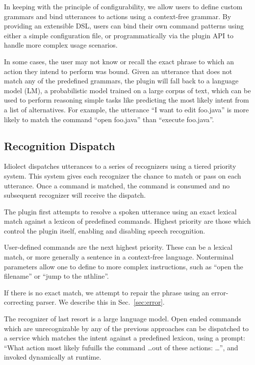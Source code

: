 \documentclass[conference]{IEEEtran}
\begin{document}
In keeping with the principle of configurability, we allow users to define custom grammars and bind utterances to actions using a context-free grammar. By providing an extensible DSL, users can bind their own command patterns using either a simple configuration file, or programmatically via the plugin API to handle more complex usage scenarios.

In some cases, the user may not know or recall the exact phrase to which an action they intend to perform was bound. Given an utterance that does not match any of the predefined grammars, the plugin will fall back to a language model (LM), a probabilistic model trained on a large corpus of text, which can be used to perform reasoning simple tasks like predicting the most likely intent from a list of alternatives. For example, the utterance ``I want to edit foo.java'' is more likely to match the command ``open foo.java'' than ``execute foo.java''.

\subsection{Recognition Dispatch}

Idiolect dispatches utterances to a series of recognizers using a tiered priority system. This system gives each recognizer the chance to match or pass on each utterance. Once a command is matched, the command is consumed and no subsequent recognizer will receive the dispatch.

The plugin first attempts to resolve a spoken utterance using an exact lexical match against a lexicon of predefined commands. Highest priority are those which control the plugin itself, enabling and disabling speech recognition.

User-defined commands are the next highest priority. These can be a lexical match, or more generally a sentence in a context-free language. Nonterminal parameters allow one to define to more complex instructions, such as ``open the \textlangle filename'' or ``jump to the \textlangle nth\textrangle line''.

If there is no exact match, we attempt to repair the phrase using an error-correcting parser. We describe this in Sec.~\ref{sec:error}.

The recognizer of last resort is a large language model. Open ended commands which are unrecognizable by any of the previous approaches can be dispatched to a service which matches the intent against a predefined lexicon, using a prompt: ``What action most likely fufuills the command \ldots out of these actions: \ldots'', and invoked dynamically at runtime.
\end{document}
